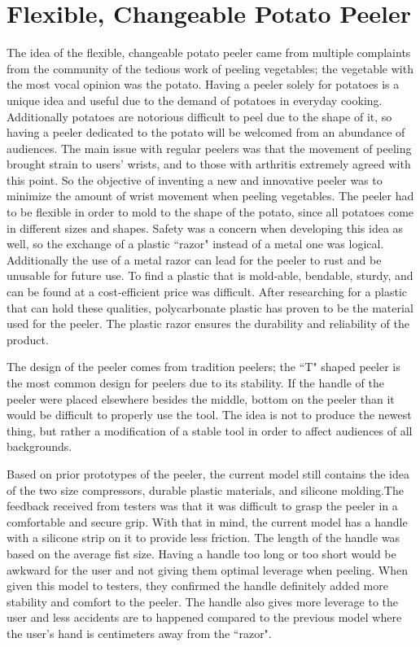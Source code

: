 \documentclass[twocolumn]{article}
\begin{document}
\section*{Flexible, Changeable Potato Peeler}
The idea of the flexible, changeable potato peeler came from multiple complaints from the community of the tedious work of peeling vegetables; the vegetable with the most vocal opinion was the potato. Having a peeler solely for potatoes is a unique idea and useful due to the demand of potatoes in everyday cooking. Additionally potatoes are notorious difficult to peel due to the shape of it, so having a peeler dedicated to the potato will be welcomed from an abundance of audiences. The main issue with regular peelers was that the movement of peeling brought strain to users' wrists, and to those with arthritis extremely agreed with this point. So the objective of inventing a new and innovative peeler was to minimize the amount of wrist movement when peeling vegetables. The peeler had to be flexible in order to mold to the shape of the potato, since all potatoes come in different sizes and shapes. Safety was a concern when developing this idea as well, so the exchange of a plastic ``razor" instead of a metal one was logical. Additionally the use of a metal razor can lead for the peeler to rust and be unusable for future use. To find a plastic that is mold-able, bendable, sturdy, and can be found at a cost-efficient price was difficult. After researching for a plastic that can hold these qualities, polycarbonate plastic has proven to be the material used for the peeler. The plastic razor ensures the durability and reliability of the product.
\par
The design of the peeler comes from tradition peelers; the ``T" shaped peeler is the most common design for peelers due to its stability. If the handle of the peeler were placed elsewhere besides the middle, bottom on the peeler than it would be difficult to properly use the tool. The idea is not to produce the newest thing, but rather a modification of a stable tool in order to affect audiences of all backgrounds.
\par
Based on prior prototypes of the peeler, the current model still contains the idea of the two size compressors, durable plastic materials, and silicone molding.The feedback received from testers was that it was difficult to grasp the peeler in a comfortable and secure grip. With that in mind, the current model has a handle with a silicone strip on it to provide less friction. The length of the handle was based on the average fist size. Having a handle too long or too short would be awkward for the user and not giving them optimal leverage when peeling. When given this model to testers, they confirmed the handle definitely added more stability and comfort to the peeler. The handle also gives more leverage to the user and less accidents are to happened compared to the previous model where the user's hand is centimeters away from the ``razor".
\end{document}
